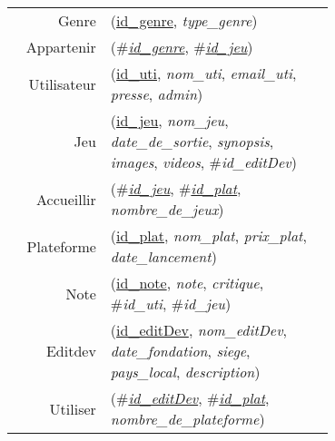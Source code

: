 
\usepackage[normalem]{ulem}
\newenvironment{mld}
  {\par\begin{minipage}{\linewidth}\begin{tabular}{rp{0.7\linewidth}}}
  {\end{tabular}\end{minipage}\par}
\newcommand{\relat}[1]{\textsc{#1}}
\newcommand{\attr}[1]{\emph{#1}}
\newcommand{\prim}[1]{\uline{#1}}
\newcommand{\foreign}[1]{\#\textsl{#1}}


\begin{mld}
  Genre & (\prim{id\_genre}, \attr{type\_genre})\\
  Appartenir & (\foreign{\prim{id\_genre}}, \foreign{\prim{id\_jeu}})\\
  Utilisateur & (\prim{id\_uti}, \attr{nom\_uti}, \attr{email\_uti}, \attr{presse}, \attr{admin})\\
  Jeu & (\prim{id\_jeu}, \attr{nom\_jeu}, \attr{date\_de\_sortie}, \attr{synopsis}, \attr{images}, \attr{videos}, \foreign{id\_editDev})\\
  Accueillir & (\foreign{\prim{id\_jeu}}, \foreign{\prim{id\_plat}}, \attr{nombre\_de\_jeux})\\
  Plateforme & (\prim{id\_plat}, \attr{nom\_plat}, \attr{prix\_plat}, \attr{date\_lancement})\\
  Note & (\prim{id\_note}, \attr{note}, \attr{critique}, \foreign{id\_uti}, \foreign{id\_jeu})\\
  Editdev & (\prim{id\_editDev}, \attr{nom\_editDev}, \attr{date\_fondation}, \attr{siege}, \attr{pays\_local}, \attr{description})\\
  Utiliser & (\foreign{\prim{id\_editDev}}, \foreign{\prim{id\_plat}}, \attr{nombre\_de\_plateforme})\\
\end{mld}